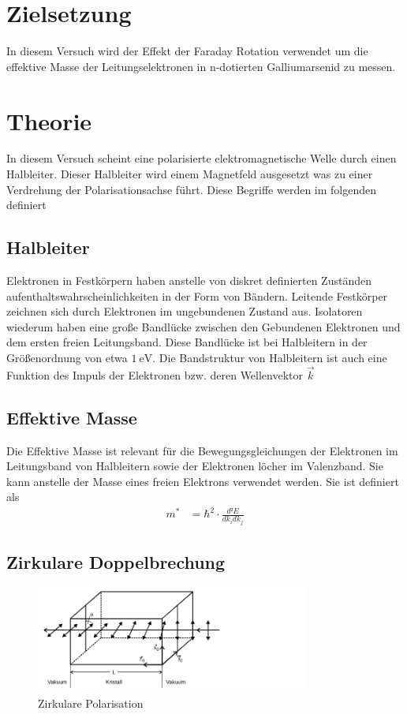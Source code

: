 \section{Zielsetzung}
In diesem Versuch wird der Effekt der Faraday Rotation verwendet um die
effektive Masse der Leitungselektronen in n-dotierten Galliumarsenid zu messen.

\section{Theorie}
In diesem Versuch scheint eine polarisierte elektromagnetische Welle durch
einen Halbleiter. Dieser Halbleiter wird einem Magnetfeld ausgesetzt was zu
einer Verdrehung der Polarisationsachse führt. Diese Begriffe werden im
folgenden definiert

\subsection{Halbleiter \cite[][Kap. 14]{book:expi3}}
Elektronen in Festkörpern haben anstelle von diskret definierten Zuständen
aufenthaltswahrscheinlichkeiten in der Form von Bändern. Leitende Festkörper
zeichnen sich durch Elektronen im ungebundenen Zustand aus. Isolatoren wiederum
haben eine große Bandlücke zwischen den Gebundenen Elektronen und dem ersten
freien Leitungsband. Diese Bandlücke ist bei Halbleitern in der Größenordnung
von etwa $\qty{1}{\eV}$. Die Bandstruktur von Halbleitern ist auch eine Funktion
des Impuls der Elektronen bzw. deren Wellenvektor $\vec{k}$

\subsection{Effektive Masse \cite[][Kap. 14]{book:expi3}}
Die Effektive Masse ist relevant für die Bewegungsgleichungen der Elektronen im
Leitungsband von Halbleitern sowie der Elektronen löcher im Valenzband. Sie
kann anstelle der Masse eines freien Elektrons verwendet werden. Sie ist
definiert als
\begin{align}
	m^* & = \hbar^2 \cdot \frac{d²E}{d k_i d k_j}
\end{align}

\subsection{Zirkulare Doppelbrechung \cite{man_a}}
\begin{figure}[H]
	\centering
	\includegraphics[width=0.8\textwidth]{./Bilder/zirpol.png}
	\caption{Zirkulare Polarisation \cite{man_a} }\label{fig:zirpol}
\end{figure}

